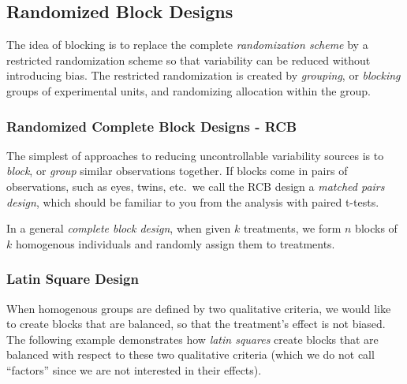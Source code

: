 \subsection{Randomized Block Designs}
The idea of blocking is to replace the complete \emph{randomization scheme} by a restricted randomization scheme so that variability can be reduced without introducing bias. 
The restricted randomization is created by \emph{grouping}, or \emph{blocking} groups of experimental units, and randomizing allocation within the group. 




\subsubsection{Randomized Complete Block Designs - RCB}
The simplest of approaches to reducing uncontrollable variability sources is to \emph{block}, or \emph{group} similar observations together. 
If blocks come in pairs of observations, such as eyes, twins, etc.\, we call the RCB design a \emph{matched pairs design}, which should be familiar to you from the analysis with paired t-tests.

In a general \emph{complete block design}, when given $k$ treatments, we form $n$ blocks of $k$ homogenous individuals and randomly assign them to treatments. 




\subsubsection{Latin Square Design}
When homogenous groups are defined by two qualitative criteria, we would like to create blocks that are balanced, so that the treatment's effect is not biased.
The following example demonstrates how \emph{latin squares} create blocks that are balanced with respect to these two qualitative criteria (which we do not call ``factors'' since we are not interested in their effects). 


